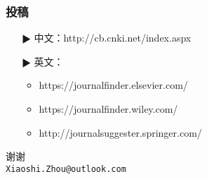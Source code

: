 \documentclass[11pt,mathserif]{beamer} %
\begin{document}
\begin{frame}
  \frametitle{投稿}
  \begin{itemize}
    \item[$\RHD$] 中文：http://cb.cnki.net/index.aspx
    \item[$\RHD$] 英文：
      \begin{itemize}
        \item https://journalfinder.elsevier.com/
        \item https://journalfinder.wiley.com/
        \item http://journalsuggester.springer.com/
      \end{itemize}
  \end{itemize}
\end{frame}


\begin{frame}{}
\begin{center}
  \huge {谢谢}\\
  \texttt{\small{Xiaoshi.Zhou@outlook.com}}

  \end{center}
\end{frame}
\end{document}
